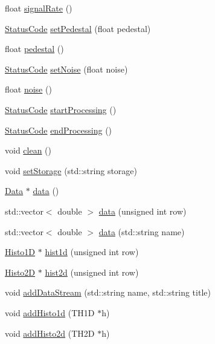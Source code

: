 \begin{DoxyCompactItemize}
\item 
float \hyperlink{classEmulateFE_a98d2e402e4707109ca14ee9f4d95c2fa}{signalRate} ()
\item 
\hyperlink{classStatusCode}{StatusCode} \hyperlink{classEmulateFE_a6328b50231c29fc5a7e6df99a3db3a29}{setPedestal} (float pedestal)
\item 
float \hyperlink{classEmulateFE_a8442db97da7b2a97fe97745e6d8d9161}{pedestal} ()
\item 
\hyperlink{classStatusCode}{StatusCode} \hyperlink{classEmulateFE_a9b1d0d30631d304fc615c064db8231ca}{setNoise} (float noise)
\item 
float \hyperlink{classEmulateFE_a3e1a2e88567bf16a5599a1602d6ba50d}{noise} ()
\item 
\hyperlink{classStatusCode}{StatusCode} \hyperlink{classProcessus_a09319bde9bed93e290f69b4e04585543}{startProcessing} ()
\item 
\hyperlink{classStatusCode}{StatusCode} \hyperlink{classProcessus_a5e4da662989d356b89d490b89c7afbfd}{endProcessing} ()
\item 
void \hyperlink{classProcessus_aaeb17673b98d2b39f3aa780e335e0968}{clean} ()
\item 
void \hyperlink{classProcessus_ad57a29b33f9021eda9f6929136f1784f}{setStorage} (std::string storage)
\item 
\hyperlink{classData}{Data} $\ast$ \hyperlink{classProcessus_a16e45f329fbce935aeef0ff3cb508228}{data} ()
\item 
std::vector$<$ double $>$ \hyperlink{classProcessus_aa7c57483cf4b9ab0b2d0ae2de8316402}{data} (unsigned int row)
\item 
std::vector$<$ double $>$ \hyperlink{classProcessus_abf4d91fb36707e1d50178bab12d21ae9}{data} (std::string name)
\item 
\hyperlink{classHisto1D}{Histo1D} $\ast$ \hyperlink{classProcessus_a409227db936baff03c0462c1bcfe8069}{hist1d} (unsigned int row)
\item 
\hyperlink{classHisto2D}{Histo2D} $\ast$ \hyperlink{classProcessus_a73b5118cb5f2b5eaad33286183b86cfc}{hist2d} (unsigned int row)
\item 
void \hyperlink{classProcessus_a308c8f193802f1d1ab49d4447d0cb281}{addDataStream} (std::string name, std::string title)
\item 
void \hyperlink{classProcessus_ad46e0d4dfdfdcbce001ee6be1746dfa4}{addHisto1d} (TH1D $\ast$h)
\item 
void \hyperlink{classProcessus_ac1ed1aed5edaeabdf18aa56775440471}{addHisto2d} (TH2D $\ast$h)

\end{DoxyCompactItemize}
